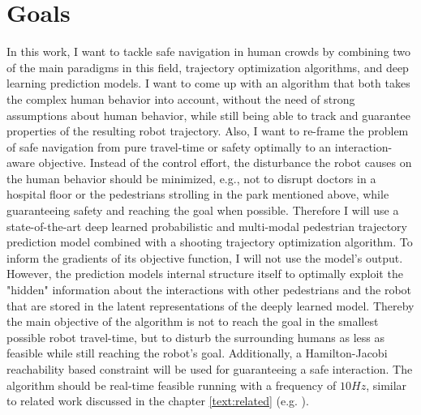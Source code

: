 \section{Goals}
\label{text:introduction/goals}
In this work, I want to tackle safe navigation in human crowds by combining two of the main paradigms in this field, trajectory optimization algorithms, and deep learning prediction models. I want to come up with an algorithm that both takes the complex human behavior into account, without the need of strong assumptions about human behavior, while still being able to track and guarantee properties of the resulting robot trajectory. Also, I want to re-frame the problem of safe navigation from pure travel-time or safety optimally to an interaction-aware objective. Instead of the control effort, the disturbance the robot causes on the human behavior should be minimized, e.g., not to disrupt doctors in a hospital floor or the pedestrians strolling in the park mentioned above, while guaranteeing safety and reaching the goal when possible.
\newline
Therefore I will use a state-of-the-art deep learned probabilistic and multi-modal pedestrian trajectory prediction model combined with a shooting trajectory optimization algorithm. To inform the gradients of its objective function, I will not use the model's output. However, the prediction models internal structure itself to optimally exploit the "hidden" information about the interactions with other pedestrians and the robot that are stored in the latent representations of the deeply learned model. Thereby the main objective of the algorithm is not to reach the goal in the smallest possible robot travel-time, but to disturb the surrounding humans as less as feasible while still reaching the robot's goal. Additionally, a Hamilton-Jacobi reachability based constraint will be used for guaranteeing a safe interaction. The algorithm should be real-time feasible running with a frequency of $10 Hz$, similar to related work discussed in the chapter \ref{text:related} (e.g. \cite{Chen2017}).
